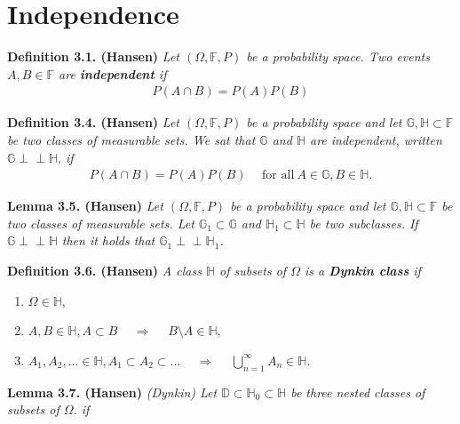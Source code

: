 \documentclass[a4paper,10pt,openany]{book}
\providecommand{\tightlist}{%
 \setlength{\itemsep}{0pt}\setlength{\parskip}{0pt}}
\begin{document}
\hypertarget{independence}{%
\section{Independence}\label{independence}}

\textbf{Definition 3.1. (Hansen)} \emph{Let \((\Omega,\mathbb{F},P)\) be a probability space. Two events \(A,B\in\mathbb{F}\) are \textbf{independent} if}
\begin{align*}
    P(A\cap B)=P(A)P(B)\tag{3.1}
\end{align*}

\textbf{Definition 3.4. (Hansen)} \emph{Let \((\Omega,\mathbb{F},P)\) be a probability space and let \(\mathbb{G},\mathbb{H}\subset \mathbb{F}\) be two classes of measurable sets. We sat that \(\mathbb{G}\) and \(\mathbb{H}\) are independent, written \(\mathbb{G}\perp \!\!\! \perp\mathbb{H}\), if}
\begin{align*}
    P(A\cap B)=P(A)P(B)\hspace{15pt}\text{for all}\ A\in\mathbb{G},B\in\mathbb{H}.\tag{3.2}
\end{align*}

\textbf{Lemma 3.5. (Hansen)} \emph{Let \((\Omega,\mathbb{F},P)\) be a probability space and let \(\mathbb{G},\mathbb{H}\subset \mathbb{F}\) be two classes of measurable sets. Let \(\mathbb{G}_1\subset \mathbb{G}\) and \(\mathbb{H}_1\subset\mathbb{H}\) be two subclasses. If \(\mathbb{G}\perp \!\!\! \perp \mathbb{H}\) then it holds that \(\mathbb{G}_1\perp \!\!\! \perp \mathbb{H}_1\).}

\textbf{Definition 3.6. (Hansen)} \emph{A class \(\mathbb{H}\) of subsets of \(\Omega\) is a \textbf{Dynkin class} if}

\begin{enumerate}
\def\labelenumi{\arabic{enumi}.}
\tightlist
\item
  \(\Omega \in\mathbb{H}\),
\item
  \(A,B\in\mathbb{H},A\subset B\hspace{15pt}\Rightarrow\hspace{15pt}B\setminus A\in\mathbb{H}\),
\item
  \(A_1,A_2,...\in\mathbb{H},A_1\subset A_2\subset ...\hspace{15pt}\Rightarrow\hspace{15pt}\bigcup_{n=1}^\infty A_n\in\mathbb{H}\).
\end{enumerate}

\textbf{Lemma 3.7. (Hansen)} \emph{(Dynkin) Let \(\mathbb{D}\subset \mathbb{H}_0\subset \mathbb{H}\) be three nested classes of subsets of \(\Omega\). if}
\end{document}
